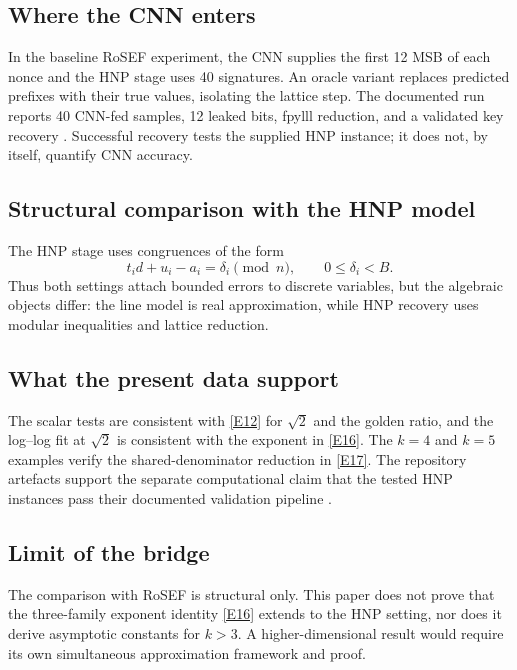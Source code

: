 \documentclass[12pt]{article}
\begin{document}
\subsection{Where the CNN enters}
In the baseline RoSEF experiment, the CNN supplies the first 12 MSB of each nonce and the HNP stage uses 40 signatures. An oracle variant replaces predicted prefixes with their true values, isolating the lattice step. The documented run reports 40 CNN-fed samples, 12 leaked bits, fpylll reduction, and a validated key recovery \cite{RoSEF}. Successful recovery tests the supplied HNP instance; it does not, by itself, quantify CNN accuracy.

\subsection{Structural comparison with the HNP model}
The HNP stage uses congruences of the form
\[
 t_i d+u_i-a_i=\delta_i\pmod n,
\qquad 0\le\delta_i<B.
\]
Thus both settings attach bounded errors to discrete variables, but the algebraic objects differ: the line model is real approximation, while HNP recovery uses modular inequalities and lattice reduction.

\subsection{What the present data support}
The scalar tests are consistent with \eqref{E12} for $\sqrt2$ and the golden ratio, and the log--log fit at $\sqrt2$ is consistent with the exponent in \eqref{E16}. The $k=4$ and $k=5$ examples verify the shared-denominator reduction in \eqref{E17}. The repository artefacts support the separate computational claim that the tested HNP instances pass their documented validation pipeline \cite{RoSEF}.

\subsection{Limit of the bridge}
The comparison with RoSEF is structural only. This paper does not prove that the three-family exponent identity \eqref{E16} extends to the HNP setting, nor does it derive asymptotic constants for $k>3$. A higher-dimensional result would require its own simultaneous approximation framework and proof.
\end{document}
